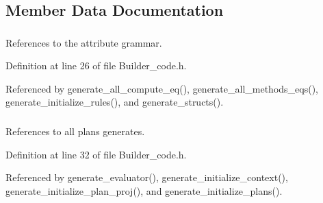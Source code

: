 \subsection{Member Data Documentation}
\hypertarget{classgenevalmag_1_1Builder__code_94e3c41b0c77596acfb34c731c17f001}{
\subsubsection[{attr\_\-grammar}]{}}
\label{classgenevalmag_1_1Builder__code_94e3c41b0c77596acfb34c731c17f001}


References to the attribute grammar. 



Definition at line 26 of file Builder\_\-code.h.

Referenced by generate\_\-all\_\-compute\_\-eq(), generate\_\-all\_\-methods\_\-eqs(), generate\_\-initialize\_\-rules(), and generate\_\-structs().\hypertarget{classgenevalmag_1_1Builder__code_ba5b99353b3ec17c3b788c7baa2ae4ce}{
\subsubsection[{b\_\-plans}]{}}
\label{classgenevalmag_1_1Builder__code_ba5b99353b3ec17c3b788c7baa2ae4ce}


References to all plans generates. 



Definition at line 32 of file Builder\_\-code.h.

Referenced by generate\_\-evaluator(), generate\_\-initialize\_\-context(), generate\_\-initialize\_\-plan\_\-proj(), and generate\_\-initialize\_\-plans().\hypertarget{classgenevalmag_1_1Builder__code_4440af64f703eb71fd4df162f39fdcc6}{
\subsubsection[{b\_\-v\_\-seq}]{}}
\label{classgenevalmag_1_1Builder__code_4440af64f703eb71fd4df162f39fdcc6}


